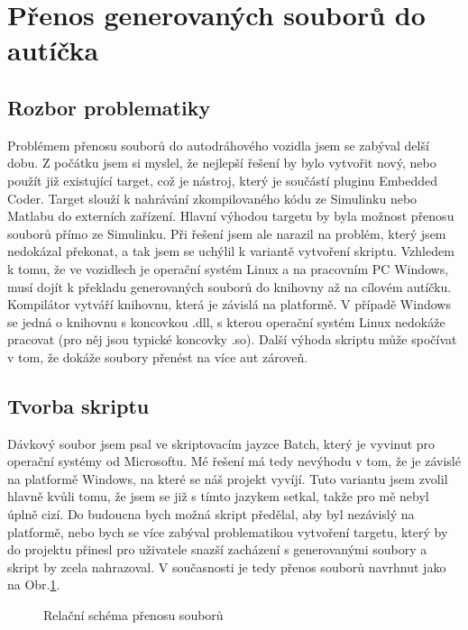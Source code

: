 \documentclass[thesis=M,czech,hidelinks]{FITthesis}[2012/06/26]
\begin{document}
\section{Přenos generovaných souborů do autíčka}
\subsection{Rozbor problematiky}
Problémem přenosu souborů do autodráhového vozidla jsem se zabýval delší dobu. Z počátku jsem si myslel, že nejlepší řešení by bylo vytvořit nový, nebo použít již existující target, což je nástroj, který je součástí pluginu Embedded Coder. Target slouží k nahrávání zkompilovaného kódu ze Simulinku nebo Matlabu do externích zařízení.\cite{target} Hlavní výhodou targetu by byla možnost přenosu souborů přímo ze Simulinku. Při řešení jsem ale narazil na problém, který jsem nedokázal překonat, a tak jsem se uchýlil k variantě vytvoření skriptu. Vzhledem k tomu, že ve vozidlech je operační systém Linux a na pracovním PC Windows, musí dojít k překladu generovaných souborů do knihovny až na cílovém autíčku. Kompilátor vytváří knihovnu, která je závislá na platformě. V případě Windows se jedná o knihovnu s koncovkou .dll, s kterou operační systém Linux nedokáže pracovat (pro něj jsou typické koncovky .so). Další výhoda skriptu může spočívat v tom, že dokáže soubory přenést na více aut zároveň.

\subsection{Tvorba skriptu}
Dávkový soubor jsem psal ve skriptovacím jayzce Batch, který je vyvinut pro operační systémy od Microsoftu. Mé řešení má tedy nevýhodu v tom, že je závislé na platformě Windows, na které se náš projekt vyvíjí. Tuto variantu jsem zvolil hlavně kvůli tomu, že jsem se již s tímto jazykem setkal, takže pro mě nebyl úplně cizí. Do budoucna bych možná skript předělal, aby byl nezávislý na platformě, nebo bych se více zabýval problematikou vytvoření targetu, který by do projektu přinesl pro uživatele snazší zacházení s generovanými soubory a skript by zcela nahrazoval. V současnosti je tedy přenos souborů navrhnut jako na Obr.\ref{fig:skript}.   
 \begin{figure}[h]
         \centering
         \caption{Relační schéma přenosu souborů}
         \label{fig:skript}
 \end{figure}
 
\end{document}
